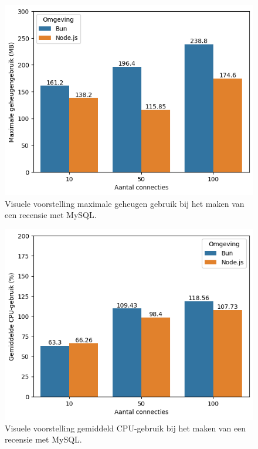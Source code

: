     \begin{figure}[H]
      \centering
      \includegraphics[width=0.7\columnwidth]{graphics/PostMySqlRAM.png}
      \caption[Geheugengebruik POST verzoek met MySQL]{\label{fig:postgeheugenmysql}Visuele voorstelling maximale geheugen gebruik bij het maken van een recensie met MySQL.}
    \end{figure}
    \begin{figure}[H]
      \centering
      \includegraphics[width=0.7\columnwidth]{graphics/PostMySqlCpu.png}
      \caption[CPU-gebruik POST verzoek met MySQL]{\label{fig:postcpumysql}Visuele voorstelling gemiddeld CPU-gebruik bij het maken van een recensie met MySQL.}
    \end{figure}
